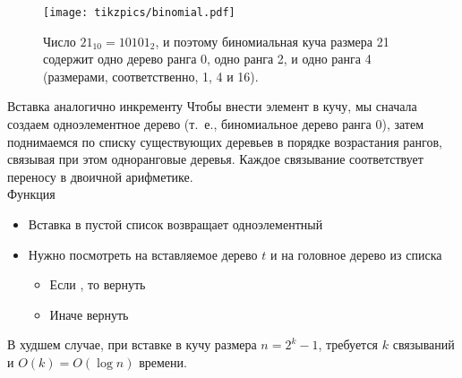  
\begin{frame}
\begin{figure}[h]
  \centering
  \texttt{[image: tikzpics/binomial.pdf]}
  \caption{Число $21_{10} = 10101_2$, и поэтому
   биномиальная куча размера 21 содержит одно дерево ранга 0, одно ранга
   2, и одно ранга 4 (размерами, соответственно, 1, 4 и 16).}
\end{figure}
\end{frame}
 
 
\begin{frame}{Вставка аналогично инкременту}
Чтобы внести элемент в кучу, мы сначала создаем одноэлементное дерево (т.~е., биномиальное дерево ранга 0), затем поднимаемся по списку существующих деревьев в порядке возрастания рангов, связывая при этом одноранговые деревья. Каждое связывание соответствует переносу в двоичной арифметике.\\
 
Функция 
\begin{itemize}
\item Вставка в пустой список возвращает одноэлементный
\item Нужно посмотреть на вставляемое дерево $t$ и на головное дерево  из списка  
\begin{itemize}
\item Если , то вернуть  
\item Иначе вернуть  
\end{itemize}
\end{itemize}
\vspace{1em}

В худшем случае, при вставке в кучу размера $n = 2^k -1$, требуется
 $k$ связываний и $O(k) = O(\log n)$ времени.
\end{frame}
 
